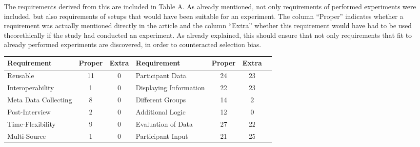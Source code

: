 The requirements derived from this are included in Table A. As already mentioned, not only requirements of performed experiments were included, but also requirements of setups that would have been suitable for an experiment. The column \enquote{Proper} indicates whether a requirement was actually mentioned directly in the article and the column \enquote{Extra} whether this requirement would have had to be used theorethically if the study had conducted an experiment. As already explained, this should ensure that not only requirements that fit to already performed experiments are discovered, in order to counteracted selection bias.

    \begin{table}[htbp]
        \centering
        \small
        \begin{tabular}{lcclccc}
        \hline
        Requirement          & \multicolumn{1}{l}{Proper} & \multicolumn{1}{l}{Extra} & Requirement & \multicolumn{1}{l}{Proper} & \multicolumn{1}{l}{Extra} \\ \hline
        Reusable                                                  & 11                         & 0                         & Participant Data                                           & 24                         & 23                        \\
        Interoperability                                           & 1                          & 0                         & Displaying Information                                     & 22                         & 23                        \\
        Meta Data Collecting                                       & 8                          & 0                         & Different Groups                                           & 14                         & 2                         \\
        Post-Interview                                             & 2                          & 0                         & Additional Logic                                           & 12                         & 0                         \\
        Time-Flexibility                                           & 9                          & 0                         & Evaluation of Data                                         & 27                         & 22                        \\
        Multi-Source                                               & 1                          & 0                         & Participant Input                                          & 21                         & 25                        \\

\end{tabular}
\end{table}
